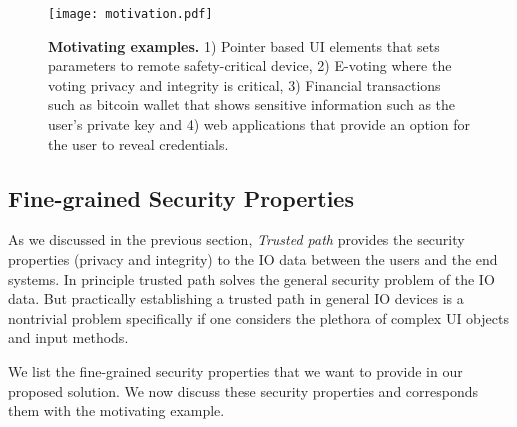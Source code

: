 \begin{figure}[t]
\centering
\texttt{[image: motivation.pdf]}
\caption{\textbf{Motivating examples.} 1) Pointer based UI elements that sets parameters to remote safety-critical device, 2) E-voting where the voting privacy and integrity is critical, 3) Financial transactions such as bitcoin wallet that shows sensitive information such as the user's private key and 4) web applications that provide an option for the user to reveal credentials.}
\label{fig:motivation}
\centering
\end{figure}

\subsection{Fine-grained Security Properties}


As we discussed in the previous section, \emph{Trusted path} provides the security properties (privacy and integrity) to the IO data between the users and the end systems. In principle trusted path solves the general security problem of the IO data. But practically establishing a trusted path in general IO devices is a nontrivial problem specifically if one considers the plethora of complex UI objects and input methods.

We list the fine-grained security properties that we want to provide in our proposed solution. We now discuss these security properties and corresponds them with the motivating example.

